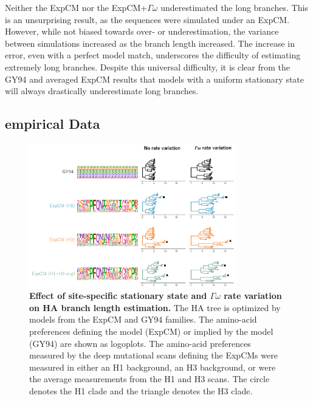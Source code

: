 \documentclass[11pt]{article}
\begin{document}
Neither the ExpCM nor the ExpCM+$\Gamma\omega$ underestimated the long branches. 
This is an unsurprising result, as the sequences were simulated under an ExpCM. 
However, while not biased towards over- or underestimation, the variance between simulations increased as the branch length increased. 
The increase in error, even with a perfect model match, underscores the difficulty of estimating extremely long branches. 
Despite this universal difficulty, it is clear from the GY94 and averaged ExpCM results that models with a uniform stationary state will always drastically underestimate long branches. 

\subsection*{empirical Data}

\begin{figure}[H]
\centerline{\includegraphics[width=0.8\textwidth]{figures/empirical_trees.pdf}}
\caption{\label{fig:empirical_trees}
\textbf{Effect of site-specific stationary state and $\Gamma\omega$ rate variation on HA branch length estimation.} 
The HA tree is optimized by models from the ExpCM and GY94 families. 
The amino-acid preferences defining the model (ExpCM) or implied by the model (GY94) are shown as logoplots. 
The amino-acid preferences measured by the deep mutational scans defining the ExpCMs were measured in either an H1 background, an H3 background, or were the average measurements from the H1 and H3 scans. 
The circle denotes the H1 clade and the triangle denotes the H3 clade. 
}
\end{figure}
\end{document}
